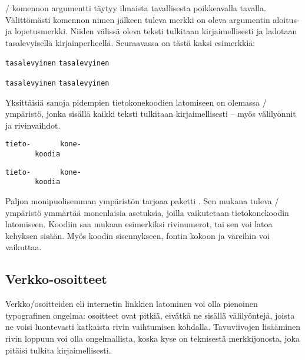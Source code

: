 \-/ komennon argumentti täytyy ilmaista tavallisesta
poikkeavalla tavalla. Välittömästi komennon nimen jälkeen tuleva merkki
on oleva argumentin aloitus- ja lopetusmerkki. Niiden välissä oleva
teksti tulkitaan kirjaimellisesti ja ladotaan tasalevyisellä
kirjainperheellä. Seuraavassa on tästä kaksi esimerkkiä:

\begin{koodilohkosis}
\verb.tasalevyinen.   %
\verb|tasalevyinen|   %
\end{koodilohkosis}

\begin{tulossis}
  \verb.tasalevyinen.
  \verb|tasalevyinen|
\end{tulossis}

\noindent
Yksittäisiä sanoja pidempien tietokonekoodien latomiseen on olemassa
\-/ ympäristö, jonka sisällä kaikki teksti
tulkitaan kirjaimellisesti -- myös välilyönnit ja rivinvaihdot.

\begin{koodilohkosis}
\begin{verbatim}
tieto-       kone-
       koodia
\end{verbatim}
\end{koodilohkosis}

\begin{tulossis}
\begin{verbatim}
tieto-       kone-
       koodia
\end{verbatim}
\end{tulossis}

\noindent
Paljon monipuolisemman ympäristön tarjoaa paketti
. Sen mukana tuleva \-/
ympäristö ymmärtää monenlaisia asetuksia, joilla vaikutetaan
tietokonekoodin latomiseen. Koodiin saa mukaan esimerkiksi rivinumerot,
tai sen voi latoa kehyksen sisään. Myös koodin sisennykseen, fontin
kokoon ja väreihin voi vaikuttaa.

\subsection{Verkko-osoitteet}

Verkko\-/osoitteiden eli internetin linkkien latominen voi olla
pienoinen typografinen ongelma: osoitteet ovat pitkiä, eivätkä ne
sisällä välilyöntejä, joista ne voisi luontevasti katkaista rivin
vaihtumisen kohdalla. Tavuviivojen lisääminen rivin loppuun voi olla
ongelmallista, koska kyse on teknisestä merkkijonosta, joka pitäisi
tulkita kirjaimellisesti.

